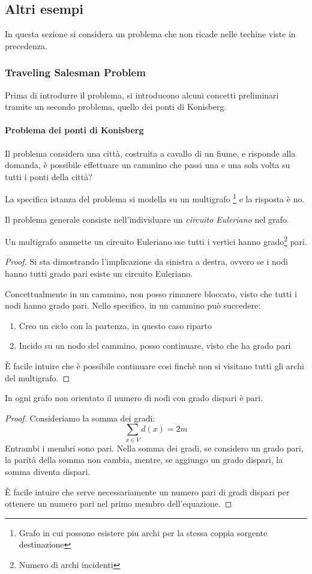\subsection{Altri esempi}
In questa sezione si considera un problema che non ricade nelle techine viste in precedenza.

\subsubsection{Traveling Salesman Problem}
Prima di introdurre il problema, si introducono alcuni concetti preliminari 
tramite un secondo problema, quello dei ponti di Konisberg.
\paragraph{Problema dei ponti di Konisberg}
Il problema considera una città, costruita a cavallo di un fiume, 
e risponde alla domanda, è possibile effettuare un cammino che passi 
una e una sola volta su tutti i ponti della città?

La specifica istanza del problema si modella su un multigrafo \footnote{Grafo in cui possono esistere piu archi per la stessa coppia
sorgente destinazione} e la risposta è no.

Il problema generale consiste nell'individuare un \emph{circuito Euleriano} nel grafo.

\begin{theorem}
    \label{teulerian}
    Un multigrafo ammette un circuito Euleriano sse tutti i vertici 
    hanno grado\footnote{Numero di archi incidenti} pari.
\end{theorem}
\begin{proof}
    Si sta dimostrando l'implicazione da sinistra a destra, 
    ovvero se i nodi hanno tutti grado pari esiste un circuito Euleriano.

    Concettualmente in un cammino, non posso rimanere bloccato, 
    visto che tutti i nodi hanno grado pari. Nello specifico, in un cammino può succedere:
    \begin{enumerate}
        \item Creo un ciclo con la partenza, in questo caso riparto
        \item Incido su un nodo del cammino, posso continuare, visto che ha grado pari
    \end{enumerate}
    È facile intuire che è possibile continuare cosi finchè non si visitano tutti gli archi del multigrafo.
\end{proof}
\begin{lemma}
    \label{lstrette}
    In ogni grafo non orientato il numero di nodi con grado dispari è pari.
\end{lemma}
\begin{proof}
    Consideriamo la somma dei gradi:
    $$\sum_{x\in V} d(x) = 2m$$
    Entrambi i membri sono pari.
    Nella somma dei gradi, se considero un grado pari, la parità della somma non cambia, 
    mentre, se aggiungo un grado dispari, la somma diventa dispari.

    È facile intuire che serve necessariamente un numero pari di gradi dispari per ottenere un 
    numero pari nel primo membro dell'equazione.
\end{proof}

